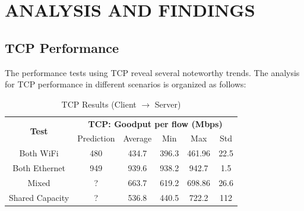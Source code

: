 
\section{ANALYSIS AND FINDINGS} \label{sec:analysis-and-findings}

    \subsection{TCP Performance} \label{subsec:tcp-performance}

        The performance tests using TCP reveal several noteworthy trends. The analysis for TCP performance in different scenarios is organized as follows:

        \begin{table}[H]
            \small
            \centering
            \begin{tabular}{|ll|lllll|}
            \hline
            \multicolumn{2}{|c|}{\multirow{2}{*}{\textbf{Test}}} & 
                \multicolumn{5}{c|}{\textbf{TCP: Goodput per flow (Mbps)}} \\
            \cline{3-7}
            \multicolumn{2}{|c|}{} &
                \multicolumn{1}{c|}{Prediction} &
                \multicolumn{1}{c|}{Average} &
                \multicolumn{1}{c|}{Min} &
                \multicolumn{1}{c|}{Max} &
                \multicolumn{1}{c|}{Std} \\
            \hline
            \multicolumn{2}{|c|}{Both WiFi} &
                \multicolumn{1}{c|}{480} &
                \multicolumn{1}{c|}{434.7} &
                \multicolumn{1}{c|}{396.3} &
                \multicolumn{1}{c|}{461.96} &
                \multicolumn{1}{c|}{22.5} \\
            \hline
            \multicolumn{2}{|c|}{Both Ethernet} &
                \multicolumn{1}{c|}{949} &
                \multicolumn{1}{c|}{939.6} &
                \multicolumn{1}{c|}{938.2} &
                \multicolumn{1}{c|}{942.7} &
                \multicolumn{1}{c|}{1.5} \\
            \hline
            \multicolumn{2}{|c|}{Mixed} &
                \multicolumn{1}{c|}{?} &
                \multicolumn{1}{c|}{663.7} &
                \multicolumn{1}{c|}{619.2} &
                \multicolumn{1}{c|}{698.86} &
                \multicolumn{1}{c|}{26.6} \\
            \hline
            \multicolumn{2}{|c|}{Shared Capacity} &
                \multicolumn{1}{c|}{?} &
                \multicolumn{1}{c|}{536.8} &
                \multicolumn{1}{c|}{440.5} &
                \multicolumn{1}{c|}{722.2} &
                \multicolumn{1}{c|}{112} \\
            \hline
            \end{tabular}
            \vspace{0.5cm}
            \caption{TCP Results (Client $\rightarrow$ Server)}
            \label{tab:tcp-results}
        \end{table}

